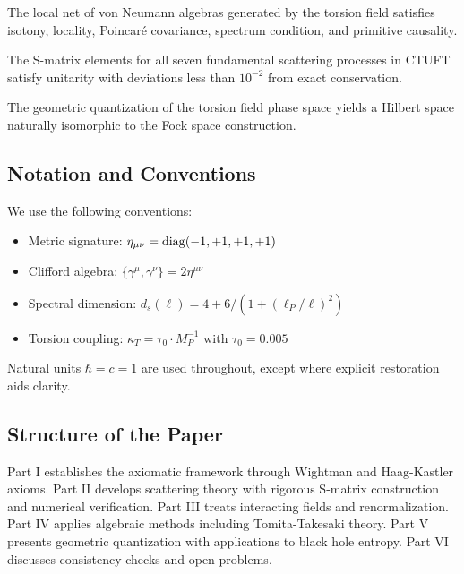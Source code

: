 \begin{theorem}
The local net of von Neumann algebras generated by the torsion field satisfies isotony, locality, Poincar\'{e} covariance, spectrum condition, and primitive causality.
\end{theorem}

\begin{theorem}
The S-matrix elements for all seven fundamental scattering processes in CTUFT satisfy unitarity with deviations less than $10^{-2}$ from exact conservation.
\end{theorem}

\begin{theorem}
The geometric quantization of the torsion field phase space yields a Hilbert space naturally isomorphic to the Fock space construction.
\end{theorem}

\subsection{Notation and Conventions}

We use the following conventions:
\begin{itemize}
    \item Metric signature: $\eta_{\mu\nu} = \mathrm{diag}(-1, +1, +1, +1)$
    \item Clifford algebra: $\{\gamma^\mu, \gamma^\nu\} = 2\eta^{\mu\nu}$
    \item Spectral dimension: $d_s(\ell) = 4 + 6/(1 + (\ell_P/\ell)^2)$
    \item Torsion coupling: $\kappa_T = \tau_0 \cdot M_P^{-1}$ with $\tau_0 = 0.005$
\end{itemize}

Natural units $\hbar = c = 1$ are used throughout, except where explicit restoration aids clarity.

\subsection{Structure of the Paper}

Part I establishes the axiomatic framework through Wightman and Haag-Kastler axioms. Part II develops scattering theory with rigorous S-matrix construction and numerical verification. Part III treats interacting fields and renormalization. Part IV applies algebraic methods including Tomita-Takesaki theory. Part V presents geometric quantization with applications to black hole entropy. Part VI discusses consistency checks and open problems.
